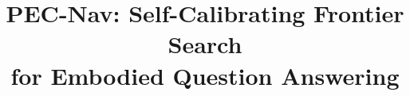 \documentclass[10pt,twocolumn,letterpaper]{article}
\begin{document}
\title{PEC-Nav: Self-Calibrating Frontier Search\\for Embodied Question Answering}

\maketitle
\thispagestyle{empty}













{\small


}
\end{document}
